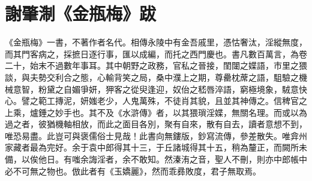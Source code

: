 \chapter*{謝肇淛《金瓶梅》跋}

《金瓶梅》一書，不著作者名代。相傳永陵中有金吾戚里，憑怙奢汰，淫縱無度，而其門客病之，採摭日逐行事，匯以成編，而托之西門慶也。書凡數百萬言，為卷二十，始末不過數年事耳。其中朝野之政務，官私之晉接，閨闥之媟語，市里之猥談，與夫勢交利合之態，心輸背笑之局，桑中濮上之期，尊罍枕蓆之語，駔驗之機械意智，粉黛之自媚爭妍，狎客之從臾逢迎，奴佁之嵇唇淬語，窮極境象，駥意快心。譬之範工摶泥，妍媸老少，人鬼萬殊，不徒肖其貌，且並其神傳之。信稗官之上乘，爐錘之妙手也。其不及《水滸傳》者，以其猥瑣淫媟，無關名理。而或以為過之者，彼猶機軸相放，而此之面目各別，聚有自來，散有自去，讀者意想不到，唯恐易盡。此豈可與褒儒俗士見哉！此書向無鏤版，鈔寫流傳，參差散失。唯弇州家藏者最為完好。余于袁中郎得其十三，于丘諸城得其十五，稍為釐正，而闕所未備，以俟他日。有嗤余誨淫者，余不敢知。然溱洧之音，聖人不刪，則亦中郎帳中必不可無之物也。倣此者有《玉嬌麗》，然而乖彞敗度，君子無取焉。
  
\begin{quotation}
\end{quotation}

